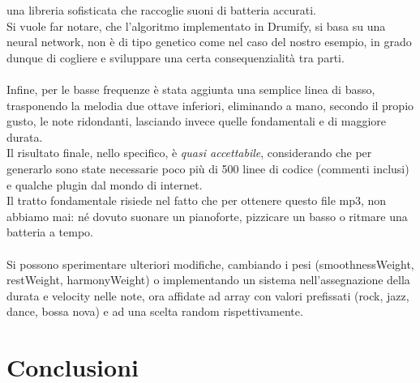 \documentclass[a4paper,12pt]{report}
\begin{document}
una libreria sofisticata che raccoglie suoni di batteria accurati. \\
Si vuole far notare, che l'algoritmo implementato in Drumify, si basa su una neural network, non è di tipo genetico come nel caso del nostro esempio, in grado dunque di cogliere e sviluppare una certa consequenzialità tra parti. \\
\\
Infine, per le basse frequenze è stata aggiunta una semplice linea di basso, trasponendo la melodia due ottave inferiori, eliminando a mano, secondo il propio gusto, le note ridondanti, lasciando invece quelle fondamentali e di maggiore durata. \\
Il risultato finale, nello specifico, è \textit{quasi accettabile}, considerando che per generarlo sono state necessarie poco più di 500 linee di codice (commenti inclusi) e qualche plugin dal mondo di internet. \\
Il tratto fondamentale risiede nel fatto che per ottenere questo file mp3, non abbiamo mai: né dovuto suonare un pianoforte, pizzicare un basso o ritmare una batteria a tempo. \\
\\
Si possono sperimentare ulteriori modifiche, cambiando i pesi (smoothnessWeight, restWeight, harmonyWeight) o implementando un sistema nell'assegnazione della durata e velocity nelle note, ora affidate ad array con valori prefissati (rock, jazz, dance, bossa nova) e ad una scelta random rispettivamente.

\chapter{Conclusioni}
\end{document}
